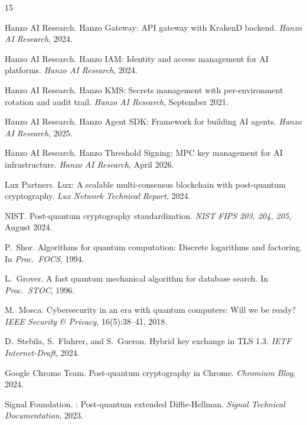 \documentclass[11pt]{article}
\begin{document}
\begin{thebibliography}{15}

{Hanzo AI Research}.
\newblock Hanzo Gateway: {API} gateway with {KrakenD} backend.
\newblock \emph{Hanzo AI Research}, 2024.

{Hanzo AI Research}.
\newblock Hanzo {IAM}: Identity and access management for {AI} platforms.
\newblock \emph{Hanzo AI Research}, 2024.

{Hanzo AI Research}.
\newblock Hanzo {KMS}: Secrets management with per-environment rotation and audit trail.
\newblock \emph{Hanzo AI Research}, September 2021.

{Hanzo AI Research}.
\newblock Hanzo Agent {SDK}: Framework for building {AI} agents.
\newblock \emph{Hanzo AI Research}, 2025.

{Hanzo AI Research}.
\newblock Hanzo Threshold Signing: {MPC} key management for {AI} infrastructure.
\newblock \emph{Hanzo AI Research}, April 2026.

{Lux Partners}.
\newblock Lux: A scalable multi-consensus blockchain with post-quantum cryptography.
\newblock \emph{Lux Network Technical Report}, 2024.

{NIST}.
\newblock Post-quantum cryptography standardization.
\newblock \emph{NIST FIPS 203, 204, 205}, August 2024.

P.~Shor.
\newblock Algorithms for quantum computation: Discrete logarithms and factoring.
\newblock In \emph{Proc.\ FOCS}, 1994.

L.~Grover.
\newblock A fast quantum mechanical algorithm for database search.
\newblock In \emph{Proc.\ STOC}, 1996.

M.~Mosca.
\newblock Cybersecurity in an era with quantum computers: Will we be ready?
\newblock \emph{IEEE Security \& Privacy}, 16(5):38--41, 2018.

D.~Stebila, S.~Fluhrer, and S.~Gueron.
\newblock Hybrid key exchange in {TLS 1.3}.
\newblock \emph{IETF Internet-Draft}, 2024.

{Google Chrome Team}.
\newblock Post-quantum cryptography in {Chrome}.
\newblock \emph{Chromium Blog}, 2024.

{Signal Foundation}.
: Post-quantum extended {Diffie-Hellman}.
\newblock \emph{Signal Technical Documentation}, 2023.

\end{thebibliography}
\end{document}
